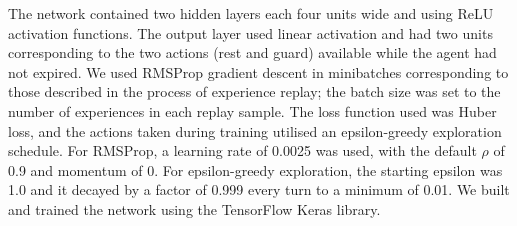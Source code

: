 The network contained two hidden layers each four units wide and using ReLU
activation functions. The output layer used linear activation and had two units
corresponding to the two actions (rest and guard) available while the agent had
not expired. We used RMSProp gradient descent in minibatches corresponding to
those described in the process of experience replay; the batch size was set to
the number of experiences in each replay sample. The loss function used was
Huber loss, and the actions taken during training utilised an epsilon-greedy
exploration schedule.
%
For RMSProp, a learning rate of 0.0025 was used, with the default $\rho$ of 0.9
and momentum of 0. For epsilon-greedy exploration, the starting epsilon was 1.0
and it decayed by a factor of 0.999 every turn to a minimum of 0.01. We built
and trained the network using the TensorFlow Keras library.

